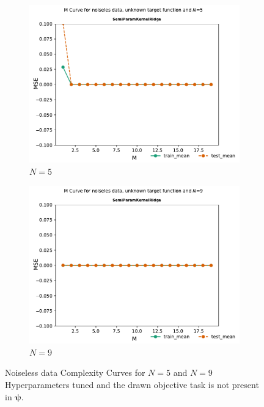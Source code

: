 \documentclass{tran-l}
\theoremstyle{definition}
\theoremstyle{remark}
\numberwithin{equation}{section}
\begin{document}
\begin{figure}[h!]
   \centering
   \begin{subfigure}[b]{0.45\textwidth}
     \centering
     \includegraphics[width=\textwidth]{Figures/unknownnoiseless/Mcurve5}
     \caption{$N=5$}
   \end{subfigure}
   \hfill
   \begin{subfigure}[b]{0.45\textwidth}
     \centering
     \includegraphics[width=\textwidth]{Figures/unknownnoiseless/Mcurve9}
     \caption{$N=9$}
   \end{subfigure}
   \caption{Noiseless data Complexity Curves for $N=5$ and $N=9$ Hyperparameters tuned and the drawn objective task is not present in $\boldsymbol{\psi}$.}
\end{figure}
\end{document}

